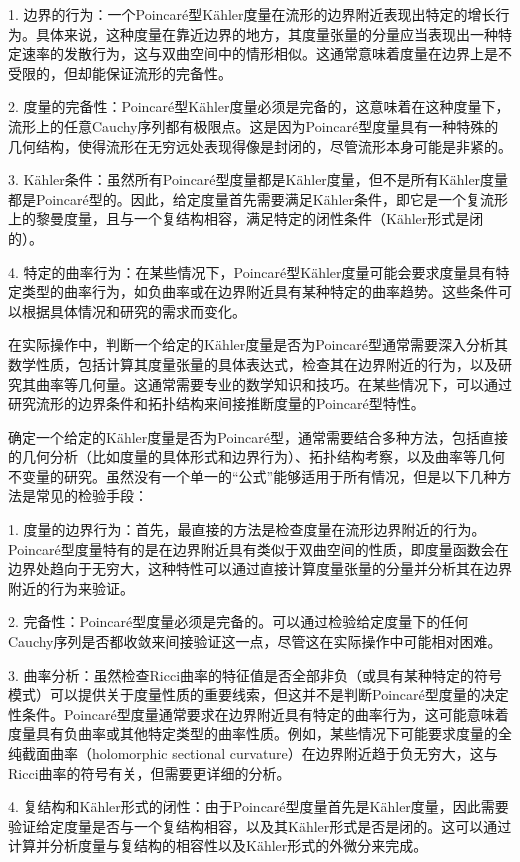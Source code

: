 \documentclass[lang=cn,zihao=-4,a4paper,fontset=none]{beautybook}
\begin{document}
1. 边界的行为：一个Poincaré型Kähler度量在流形的边界附近表现出特定的增长行为。具体来说，这种度量在靠近边界的地方，其度量张量的分量应当表现出一种特定速率的发散行为，这与双曲空间中的情形相似。这通常意味着度量在边界上是不受限的，但却能保证流形的完备性。

2. 度量的完备性：Poincaré型Kähler度量必须是完备的，这意味着在这种度量下，流形上的任意Cauchy序列都有极限点。这是因为Poincaré型度量具有一种特殊的几何结构，使得流形在无穷远处表现得像是封闭的，尽管流形本身可能是非紧的。

3. Kähler条件：虽然所有Poincaré型度量都是Kähler度量，但不是所有Kähler度量都是Poincaré型的。因此，给定度量首先需要满足Kähler条件，即它是一个复流形上的黎曼度量，且与一个复结构相容，满足特定的闭性条件（Kähler形式是闭的）。

4. 特定的曲率行为：在某些情况下，Poincaré型Kähler度量可能会要求度量具有特定类型的曲率行为，如负曲率或在边界附近具有某种特定的曲率趋势。这些条件可以根据具体情况和研究的需求而变化。

在实际操作中，判断一个给定的Kähler度量是否为Poincaré型通常需要深入分析其数学性质，包括计算其度量张量的具体表达式，检查其在边界附近的行为，以及研究其曲率等几何量。这通常需要专业的数学知识和技巧。在某些情况下，可以通过研究流形的边界条件和拓扑结构来间接推断度量的Poincaré型特性。

确定一个给定的Kähler度量是否为Poincaré型，通常需要结合多种方法，包括直接的几何分析（比如度量的具体形式和边界行为）、拓扑结构考察，以及曲率等几何不变量的研究。虽然没有一个单一的“公式”能够适用于所有情况，但是以下几种方法是常见的检验手段：

1. 度量的边界行为：首先，最直接的方法是检查度量在流形边界附近的行为。Poincaré型度量特有的是在边界附近具有类似于双曲空间的性质，即度量函数会在边界处趋向于无穷大，这种特性可以通过直接计算度量张量的分量并分析其在边界附近的行为来验证。

2. 完备性：Poincaré型度量必须是完备的。可以通过检验给定度量下的任何Cauchy序列是否都收敛来间接验证这一点，尽管这在实际操作中可能相对困难。

3. 曲率分析：虽然检查Ricci曲率的特征值是否全部非负（或具有某种特定的符号模式）可以提供关于度量性质的重要线索，但这并不是判断Poincaré型度量的决定性条件。Poincaré型度量通常要求在边界附近具有特定的曲率行为，这可能意味着度量具有负曲率或其他特定类型的曲率性质。例如，某些情况下可能要求度量的全纯截面曲率（holomorphic sectional curvature）在边界附近趋于负无穷大，这与Ricci曲率的符号有关，但需要更详细的分析。

4. 复结构和Kähler形式的闭性：由于Poincaré型度量首先是Kähler度量，因此需要验证给定度量是否与一个复结构相容，以及其Kähler形式是否是闭的。这可以通过计算并分析度量与复结构的相容性以及Kähler形式的外微分来完成。
\end{document}
